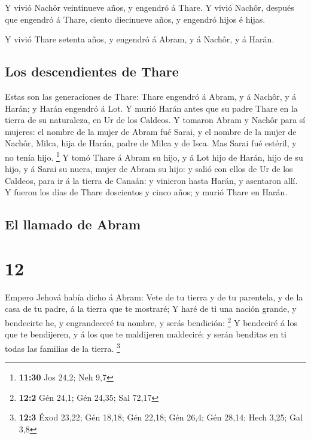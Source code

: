  Y vivió Nachôr veintinueve años, y engendró á Thare.
 Y vivió Nachôr, después que engendró á Thare, ciento
diecinueve años, y engendró hijos é hijas.

 Y vivió Thare setenta años, y engendró á Abram, y á
Nachôr, y á Harán.

\hypertarget{los-descendientes-de-thare}{%
\subsection{Los descendientes de
Thare}\label{los-descendientes-de-thare}}

 Estas son las generaciones de Thare: Thare engendró á
Abram, y á Nachôr, y á Harán; y Harán engendró á Lot.  Y
murió Harán antes que su padre Thare en la tierra de su naturaleza, en
Ur de los Caldeos.  Y tomaron Abram y Nachôr para sí
mujeres: el nombre de la mujer de Abram fué Sarai, y el nombre de la
mujer de Nachôr, Milca, hija de Harán, padre de Milca y de Isca.
 Mas Sarai fué estéril, y no tenía hijo. \footnote{\textbf{11:30}
  Jos 24,2; Neh 9,7}  Y tomó Thare á Abram su hijo, y á
Lot hijo de Harán, hijo de su hijo, y á Sarai su nuera, mujer de Abram
su hijo: y salió con ellos de Ur de los Caldeos, para ir á la tierra de
Canaán: y vinieron hasta Harán, y asentaron allí.  Y
fueron los días de Thare doscientos y cinco años; y murió Thare en
Harán.

\hypertarget{el-llamado-de-abram}{%
\subsection{El llamado de Abram}\label{el-llamado-de-abram}}

\hypertarget{section-11}{%
\section{12}\label{section-11}}

 Empero Jehová había dicho á Abram: Vete de tu tierra y de
tu parentela, y de la casa de tu padre, á la tierra que te mostraré;
 Y haré de ti una nación grande, y bendecirte he, y
engrandeceré tu nombre, y serás bendición: \footnote{\textbf{12:2} Gén
  24,1; Gén 24,35; Sal 72,17}  Y bendeciré á los que te
bendijeren, y á los que te maldijeren maldeciré: y serán benditas en ti
todas las familias de la tierra. \footnote{\textbf{12:3} Éxod 23,22; Gén
  18,18; Gén 22,18; Gén 26,4; Gén 28,14; Hech 3,25; Gal 3,8}

